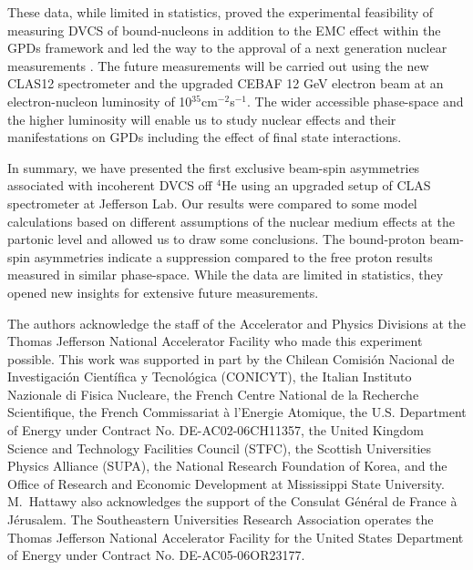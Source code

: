 \documentclass[twocolumn,nofootinbib,showpacs,prl,superscriptaddress,secnumarabic,amssymb,nobibnotes,aps,floatfix]{revtex4}
\begin{document}
These data, while limited in statistics, proved the experimental feasibility of 
measuring DVCS of bound-nucleons in addition to the EMC effect within the GPDs 
framework and led the way to the approval of a next generation nuclear 
measurements \cite{Armstrong:2017wfw}. The future measurements will be carried 
out using the new CLAS12 spectrometer and the upgraded CEBAF 12 GeV electron 
beam at an electron-nucleon luminosity of 10$^{35}$cm$^{-2}$s$^{-1}$. The wider 
accessible phase-space and the higher luminosity will enable us to study 
nuclear effects and their manifestations on GPDs including the effect of final 
state interactions.


In summary, we have presented the first exclusive beam-spin asymmetries 
associated with incoherent DVCS off $^4$He using an upgraded setup of CLAS 
spectrometer at Jefferson Lab. Our results were compared to some model 
calculations based on different assumptions of the nuclear medium effects at 
the partonic level and allowed us to draw some conclusions. The bound-proton 
beam-spin asymmetries indicate a suppression compared to the free proton 
results measured in similar phase-space. While the data are limited in 
statistics, they opened new insights for extensive future measurements.     


The authors acknowledge the staff of the Accelerator and Physics Divisions at 
the Thomas Jefferson National Accelerator Facility who made this experiment 
possible. This work was supported in part by the Chilean Comisi\'on Nacional de 
Investigaci\'on Cient\'ifica y Tecnol\'ogica (CONICYT), the Italian Instituto 
Nazionale di Fisica Nucleare, the French Centre National de la Recherche 
Scientifique, the French Commissariat \`a l'Energie Atomique, the U.S.  
Department of Energy under Contract No. DE-AC02-06CH11357, the United Kingdom 
Science and Technology Facilities Council (STFC), the Scottish Universities 
Physics Alliance (SUPA), the National Research Foundation of Korea, and the 
Office of Research and Economic Development at Mississippi State University.  
M.~Hattawy also acknowledges the support of the Consulat G\'en\'eral de France 
\`a J\'erusalem.  The Southeastern Universities Research Association operates 
the Thomas Jefferson National Accelerator Facility for the United States 
Department of Energy under Contract No. DE-AC05-06OR23177.
\end{document}
